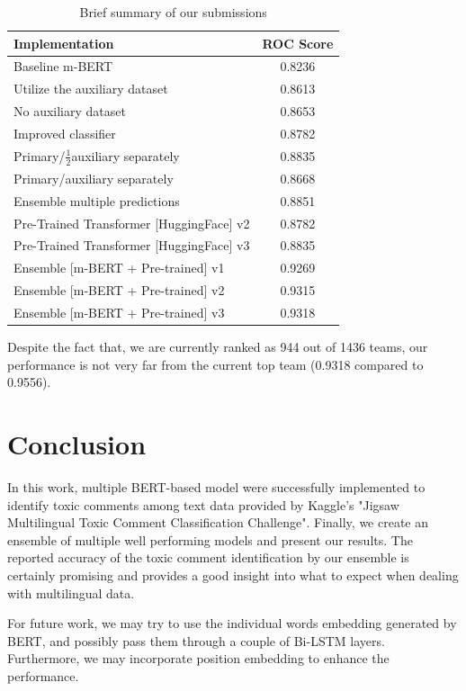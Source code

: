 \documentclass[10pt,twocolumn,letterpaper]{article}
\begin{document}
\begin{table}
\begin{center}
\begin{tabular}{|l|c|}
\hline
Implementation	& ROC Score \\
\hline\hline

Baseline m-BERT	& 0.8236    \\
Utilize the auxiliary dataset & 0.8613 \\
No auxiliary dataset	&0.8653 \\
Improved classifier & 0.8782 \\
Primary/$\frac{1}{2}$auxiliary separately & 0.8835 \\
Primary/auxiliary separately & 0.8668  \\
Ensemble multiple predictions & 0.8851 \\
Pre-Trained Transformer [HuggingFace] v2	&0.8782 \\
Pre-Trained Transformer [HuggingFace] v3	&0.8835  \\
Ensemble [m-BERT + Pre-trained] v1 	& 0.9269   \\
Ensemble [m-BERT + Pre-trained] v2 	& 0.9315   \\
Ensemble [m-BERT + Pre-trained] v3 	& 0.9318  \\

\hline
\end{tabular}
\end{center}
\caption{\label{ResultsSummary} Brief summary of our submissions}
\end{table}
Despite the fact that, we are currently ranked as 944 out of 1436 teams, our performance is not very far from the current top team (0.9318 compared to 0.9556). 

\section{Conclusion}

In this work, multiple BERT-based model were successfully implemented to identify toxic comments among text data provided by Kaggle's "Jigsaw Multilingual Toxic Comment Classification Challenge". Finally, we create an ensemble of multiple well performing models and present our results. The reported accuracy of the toxic comment identification by our ensemble is certainly promising and provides a good insight into what to expect when dealing with multilingual data.  

For future work, we may try to use the individual words embedding generated by BERT, and possibly pass them through a couple of Bi-LSTM layers. Furthermore, we may incorporate position embedding to enhance the performance.


{\small


}
\end{document}
